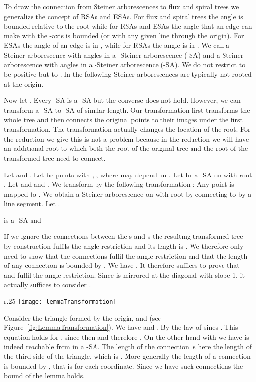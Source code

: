 \documentclass{journalA4}
\begin{document}
To draw the connection from Steiner arborescences to flux and spiral trees we generalize the concept of RSAs and ESAs. For flux and spiral trees the angle  is bounded relative to the root while for RSAs and ESAs the angle that an edge can make with the -axis is bounded (or with any given line through the origin). For ESAs the angle of an edge is in , while for RSAs the angle is in . We call a Steiner arborescence with angles in  a -Steiner arborescence (-SA) and a Steiner arborescence with angles in  a -Steiner arborescence (-SA). We do not restrict  to be positive but to . In the following Steiner arborescences are typically not rooted at the origin.

Now let . Every -SA is a -SA but the converse does not hold.
However, we can transform a -SA to -SA of similar length. Our transformation first transforms the whole tree and then connects the original points to their images under the first transformation. The transformation actually changes the location of the root. For the reduction we give this is not a problem because in the reduction we will have an additional root to which both the root of the original tree and the root of the transformed tree need to connect.

Let  and . Let  be points with , , where  may depend on . Let  be a -SA on  with root .
Let  and  and .
We transform  by the following transformation : Any point  is mapped to . We obtain a Steiner arborescence  on  with root  by connecting  to  by a line segment. Let .
\begin{lemma}\label{lem:transtree}
 is a -SA and

\end{lemma}

 If we ignore the connections between the s and s the resulting transformed tree by construction fulfils the angle restriction and its length is . We therefore only need to show that the connections fulfil the angle restriction and that the length of any connection is bounded by . We have . It therefore suffices to prove that  and  fulfil the angle restriction. Since  is  mirrored at the diagonal with slope 1, it actually suffices to consider .

\begin{wrapfigure}[8]{r}{.25\textwidth}
  \centering
  \texttt{[image: lemmaTransformation]}
  \small{\caption{Lemma~\ref{lem:transtree}.\label{fig:LemmaTransformation}}}
\end{wrapfigure}

Consider the triangle formed by the origin,  and  (see Figure~\ref{fig:LemmaTransformation}). We have  and . By the law of sines . This equation holds for , since then  and therefore . On the other hand with  we have  is indeed reachable from  in a  -SA. The length of the connection is here the length of the third side of the triangle, which is . More generally the length of a connection is bounded by , that is  for each coordinate. Since we have  such connections the bound of the lemma holds. \hfill\QED
\medskip
\end{document}
